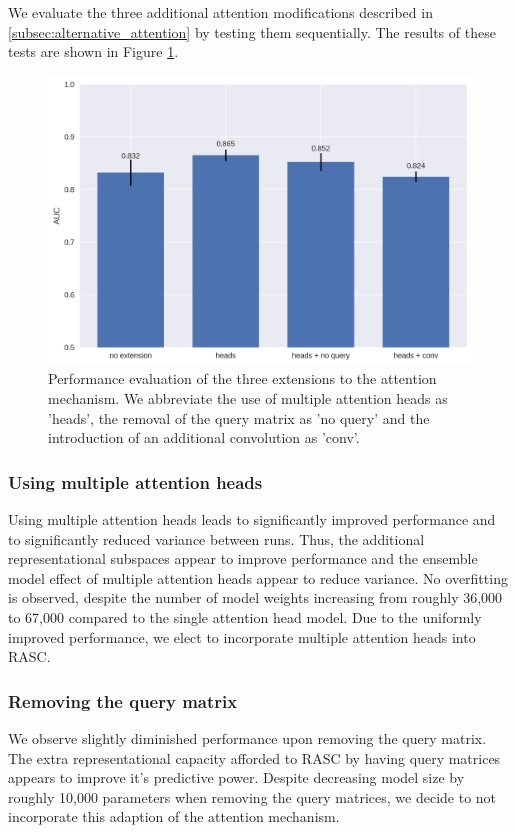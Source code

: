 We evaluate the three additional attention modifications described in \ref{subsec:alternative_attention} by testing them sequentially. The results of these tests are shown in Figure \ref{fig:attn_extension_barcharts}. 

\begin{figure}
	\centering\includegraphics[width=1\textwidth]{../visualizations/ch5-results/attn_extension_barcharts.png} 
	\caption{Performance evaluation of the three extensions to the attention mechanism. We abbreviate the use of multiple attention heads as 'heads', the removal of the query matrix as 'no query' and the introduction of an additional convolution as 'conv'. }
	\label{fig:attn_extension_barcharts}
\end{figure}

\subsubsection{Using multiple attention heads} \label{subsubsec:result_heads}
Using multiple attention heads leads to significantly improved performance and to significantly reduced variance between runs. Thus, the additional representational subspaces appear to improve performance and the ensemble model effect of multiple attention heads appear to reduce variance. No overfitting is observed, despite the number of model weights increasing from roughly 36,000 to 67,000 compared to the single attention head model. Due to the uniformly improved performance, we elect to incorporate multiple attention heads into RASC. 


\subsubsection{Removing the query matrix}  %
We observe slightly diminished performance upon removing the query matrix. The extra representational capacity afforded to RASC by having query matrices appears to improve it's predictive power. Despite decreasing model size by roughly 10,000 parameters when removing the query matrices, we decide to not incorporate this adaption of the attention mechanism. 

